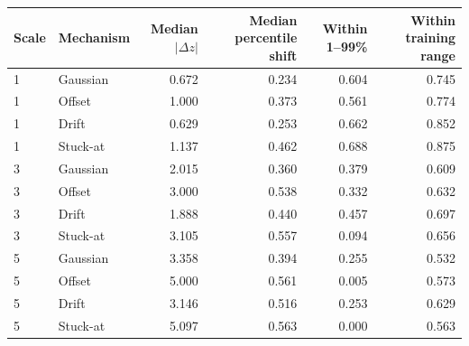 \begin{tabular}{llrrrr}
\toprule
Scale & Mechanism & Median $|\Delta z|$ & Median percentile shift & Within 1--99\% & Within training range \\
\midrule
1 & Gaussian & 0.672 & 0.234 & 0.604 & 0.745 \\
1 & Offset & 1.000 & 0.373 & 0.561 & 0.774 \\
1 & Drift & 0.629 & 0.253 & 0.662 & 0.852 \\
1 & Stuck-at & 1.137 & 0.462 & 0.688 & 0.875 \\
3 & Gaussian & 2.015 & 0.360 & 0.379 & 0.609 \\
3 & Offset & 3.000 & 0.538 & 0.332 & 0.632 \\
3 & Drift & 1.888 & 0.440 & 0.457 & 0.697 \\
3 & Stuck-at & 3.105 & 0.557 & 0.094 & 0.656 \\
5 & Gaussian & 3.358 & 0.394 & 0.255 & 0.532 \\
5 & Offset & 5.000 & 0.561 & 0.005 & 0.573 \\
5 & Drift & 3.146 & 0.516 & 0.253 & 0.629 \\
5 & Stuck-at & 5.097 & 0.563 & 0.000 & 0.563 \\
\bottomrule
\end{tabular}
